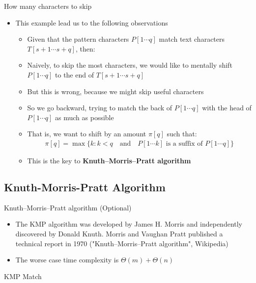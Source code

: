 \documentclass[10pt,xcolor={table,dvipsnames},t]{beamer}
\begin{document}
\begin{frame}{How many characters to skip}
  \begin{itemize}
    \item This example lead us to the following observations
    \begin{itemize}
      \item Given that the pattern characters $P[1\cdots q]$ match text characters $T[s+1\cdots s+q]$, then:
      \item Naively, to skip the most characters, we would like to mentally shift $P[1\cdots q]$ to the end of $T[s+1\cdots s+q]$
      \item But this is wrong, because we might skip useful characters
      \item So we go backward, trying to match the back of $P[1\cdots q]$ with the head of $P[1\cdots q]$ as much as possible
      \item That is, we want to shift by an amount $\pi[q]$ such that:
      \begin{align*}
        \boxed{\pi[q] = \max \{k: k < q \quad \text{and} \quad P[1\cdots k] \text{ is a suffix of } P[1\cdots q]\}}
      \end{align*}
      \item This is the key to \textbf{Knuth–Morris–Pratt algorithm}
    \end{itemize}
  \end{itemize}
\end{frame}

\subsection{Knuth-Morris-Pratt Algorithm}

\begin{frame}[fragile]{Knuth–Morris–Pratt algorithm (Optional)}
  \begin{itemize}
    \item The KMP algorithm was developed by James H. Morris and independently discovered by Donald Knuth. Morris and Vaughan Pratt published a technical report in 1970 ("Knuth–Morris–Pratt algorithm", Wikipedia)
    \item The worse case time complexity is $\Theta(m)+\Theta(n)$
  \end{itemize}
\end{frame}

\begin{frame}[fragile]
  \begin{algorithm}[H]
    \caption{KMP Match}\label{alg:kmp_algorithm}
    \begin{algorithmic}
        \EndWhile
        \EndIf
        \EndIf
      \EndFor
    \end{algorithmic}
  \end{algorithm}
\end{frame}
\end{document}
